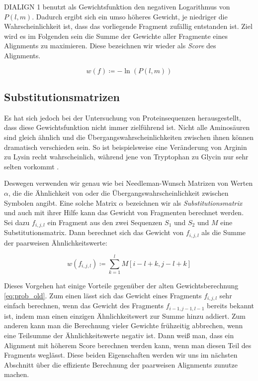 DIALIGN 1 benutzt als Gewichtsfunktion den negativen Logarithmus von $P(l,m)$. Dadurch ergibt sich ein umso höheres Gewicht, je niedriger die Wahrscheinlichkeit ist, dass das vorliegende Fragment zufällig entstanden ist. Ziel wird es im Folgenden sein die Summe der Gewichte aller Fragmente eines Alignments zu maximieren. Diese bezeichnen wir wieder als \emph{Score} des Alignments.

\begin{equation}\label{eq:weight_old}
	w(f) \coloneqq -\ln(P(l,m))	
\end{equation}

\subsection{Substitutionsmatrizen}\label{subsec:subs_matr}

Es hat sich jedoch bei der Untersuchung von Proteinsequenzen herausgestellt, dass diese Gewichtsfunktion nicht immer zielführend ist. Nicht alle Aminosäuren sind gleich ähnlich und die Übergangswahrscheinlichkeiten zwischen ihnen können dramatisch verschieden sein. So ist beispielsweise eine Veränderung von Arginin zu Lysin recht wahrscheinlich, während jene von Tryptophan zu Glycin nur sehr selten vorkommt \cite{p13}. 

Deswegen verwenden wir genau wie bei Needleman-Wunsch Matrizen von Werten $\alpha$, die die Ähnlichkeit von oder die Übergangswahrscheinlichkeit zwischen Symbolen angibt. Eine solche Matrix $\alpha$ bezeichnen wir als \emph{Substitutionsmatrix} und auch mit ihrer Hilfe kann das Gewicht von Fragmenten berechnet werden. Sei dazu $f_{i,j,l}$ ein Fragment aus den zwei Sequenzen $S_1$ und $S_2$ und $M$ eine Substitutionsmatrix. Dann berechnet sich das Gewicht von $f_{i,j,l}$ als die Summe der paarweisen Ähnlichkeitswerte:

\begin{equation}
	w(f_{i,j,l}) \coloneqq \sum_{k=1}^{l} M[i\!-\!l\!+\!k,j\!-\!l\!+\!k]
\end{equation}

Dieses Vorgehen hat einige Vorteile gegenüber der alten Gewichtsberechnung \eqref{eq:prob_old}. Zum einen lässt sich das Gewicht eines Fragments $f_{i,j,l}$ sehr einfach berechnen, wenn das Gewicht des Fragments $f_{i-1,j-1,l-1}$ bereits bekannt ist, indem man einen einzigen Ähnlichkeitswert zur Summe hinzu addiert. Zum anderen kann man die Berechnung vieler Gewichte frühzeitig abbrechen, wenn eine Teilsumme der Ähnlichkeitswerte negativ ist. Dann weiß man, dass ein Alignment mit höherem Score berechnen werden kann, wenn man diesen Teil des Fragments weglässt. Diese beiden Eigenschaften werden wir uns im nächsten Abschnitt über die effiziente Berechnung der paarweisen Alignments zunutze machen.

